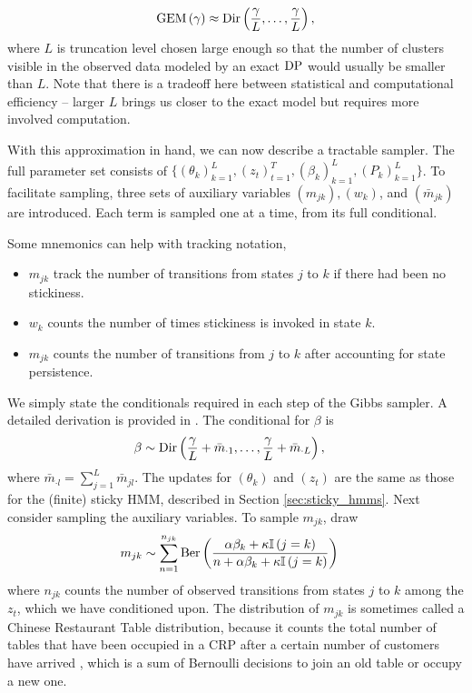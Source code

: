 \documentclass[14pt]{extarticle}
\begin{document}
\begin{align*}
  \text{GEM}\left(\gamma\right) \approx \textnormal{Dir}\left(\frac{\gamma}{L}, \dots, \frac{\gamma}{L}\right),
\end{align*}
where $L$ is truncation level chosen large enough so that the number of clusters
visible in the observed data modeled by an exact $\textnormal{DP}$ would usually be smaller
than $L$. Note that there is a tradeoff here between statistical and
computational efficiency -- larger $L$ brings us closer to the exact model but
requires more involved computation.

With this approximation in hand, we can now describe a tractable sampler. The
full parameter set consists of $\{\left(\theta_k\right)_{k = 1}^{L},
\left(z_t\right)_{t = 1}^{T}, \left(\beta_{k}\right)_{k = 1}^{L},
\left(P_{k}\right)_{k = 1}^{L} \}$. To facilitate sampling, three sets of
auxiliary variables $\left(m_{jk}\right), \left(w_k\right)$, and
  $\left(\bar{m}_{jk}\right)$ are introduced. Each term is sampled one at a
  time, from its full conditional.

  Some mnemonics can help with tracking notation,
\begin{itemize}
\item $m_{jk}$ track the number of transitions from states $j$ to $k$ if there
  had been no stickiness.
\item $w_k$ counts the number of times stickiness is invoked in state $k$.
\item $m_{jk}$ counts the number of transitions from $j$ to $k$ after accounting
  for state persistence.
\end{itemize}

We simply state the conditionals required in each step of the Gibbs sampler. A
detailed derivation is provided in \citep{fox2009bayesian}. The conditional for
$\beta$ is
\begin{align*}
  \beta &\sim \textnormal{Dir}\left(\frac{\gamma}{L} + \bar{m}_{\cdot 1}, \dots, \frac{\gamma}{L} + \bar{m}_{\cdot L}\right),
\end{align*}
where $\bar{m}_{\cdot l} = \sum_{j = 1}^{L} \bar{m}_{jl}$. The updates for
$\left(\theta_k\right)$ and $\left(z_t\right)$ are the same as those for the
(finite) sticky HMM, described in Section \ref{sec:sticky_hmms}. Next consider
sampling the auxiliary variables. To sample $m_{jk}$, draw
\begin{align*}
  m_{jk} &\sim \sum_{n = 1}^{n_{jk}} \textnormal{Ber}\left(\frac{\alpha \beta_{k} + \kappa\mathbb{I}\left({j = k}\right)}{n + \alpha \beta_{k} + \kappa \mathbb{I}\left({j = k}\right)}\right)
\end{align*}
where $n_{jk}$ counts the number of observed transitions from states $j$ to $k$
among the $z_{t}$, which we have conditioned upon. The distribution of $m_{jk}$
is sometimes called a Chinese Restaurant Table distribution, because it counts
the total number of tables that have been occupied in a CRP after a certain
number of customers have arrived \citep{zhou2012augment}, which is a sum of
Bernoulli decisions to join an old table or occupy a new one.
\end{document}
